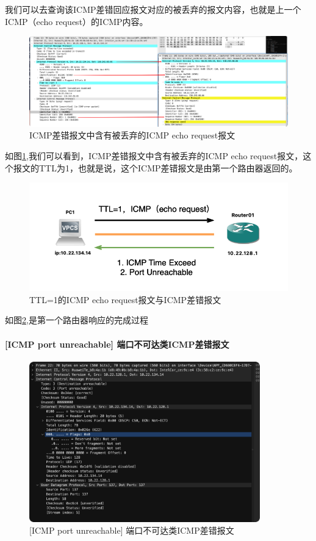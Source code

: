 \documentclass[a4paper,12pt]{report}
\begin{document}
\begin{spacing}{1.5}
我们可以去查询该ICMP差错回应报文对应的被丢弃的报文内容，也就是上一个ICMP（echo request）的ICMP内容。

\begin{figure}[htb!]
  \centering
\includegraphics[width=12cm]{figure/timecompare.png}
\caption{ICMP差错报文中含有被丢弃的ICMP echo request报文}
\label{pic:timecompare}
\end{figure}

如图\ref{pic:timecompare},我们可以看到，ICMP差错报文中含有被丢弃的ICMP echo request报文，这个报文的TTL为1，也就是说，这个ICMP差错报文是由第一个路由器返回的。

\begin{figure}[htb!]
  \centering
\includegraphics[width=12cm]{figure/ttl-1.png}
\caption{TTL=1的ICMP echo request报文与ICMP差错报文}
\label{pic:ttl-1}
\end{figure}

如图\ref{pic:ttl-1},是第一个路由器响应的完成过程


\paragraph*{[ICMP port unreachable] 端口不可达类ICMP差错报文}


\begin{figure}[htb!]
  \centering
\includegraphics[width=10cm]{figure/des.png}
\caption{[ICMP port unreachable] 端口不可达类ICMP差错报文}
\label{pic:des}
\end{figure}



\end{spacing}
\end{document}
